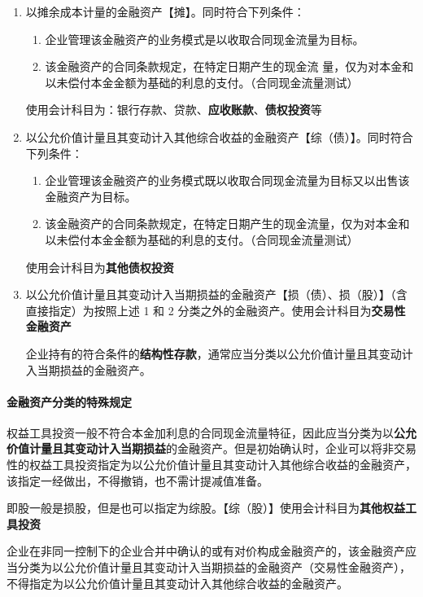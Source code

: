 \documentclass[UTF8,12pt]{ctexart}
\numberwithin{equation}{section} %
\numberwithin{figure}{section}
\numberwithin{table}{section}
\begin{document}
	\begin{enumerate}
		\item 以摊余成本计量的金融资产【摊】。同时符合下列条件：
		\begin{enumerate}
			\item 企业管理该金融资产的业务模式是以收取合同现金流量为目标。
			
			\item 该金融资产的合同条款规定，在特定日期产生的现金流 量，仅为对本金和以未偿付本金金额为基础的利息的支付。（合同现金流量测试）
		\end{enumerate}
	
		使用会计科目为：银行存款、贷款、\textbf{应收账款}、\textbf{债权投资}等
		
		\item 以公允价值计量且其变动计入其他综合收益的金融资产【综（债）】。同时符合下列条件：
		\begin{enumerate}
			\item 企业管理该金融资产的业务模式既以收取合同现金流量为目标又以出售该金融资产为目标。
			
			\item 该金融资产的合同条款规定，在特定日期产生的现金流量，仅为对本金和以未偿付本金金额为基础的利息的支付。（合同现金流量测试）
		\end{enumerate}
	
		使用会计科目为\textbf{其他债权投资}
		
		\item 以公允价值计量且其变动计入当期损益的金融资产【损（债）、损（股）】（含直接指定）为按照上述 1 和 2 分类之外的金融资产。使用会计科目为\textbf{交易性金融资产}
		
		企业持有的符合条件的\textbf{结构性存款}，通常应当分类以公允价值计量且其变动计入当期损益的金融资产。
	\end{enumerate}
	
	\paragraph{金融资产分类的特殊规定}
	权益工具投资一般不符合本金加利息的合同现金流量特征，因此应当分类为以\textbf{公允价值计量且其变动计入当期损益}的金融资产。但是初始确认时，企业可以将非交易性的权益工具投资指定为以公允价值计量且其变动计入其他综合收益的金融资产，该指定一经做出，不得撤销，也不需计提减值准备。
	
	即股一般是损股，但是也可以指定为综股。【综（股）】使用会计科目为\textbf{其他权益工具投资}
	
	企业在非同一控制下的企业合并中确认的或有对价构成金融资产的，该金融资产应当分类为以公允价值计量且其变动计入当期损益的金融资产（交易性金融资产），不得指定为以公允价值计量且其变动计入其他综合收益的金融资产。
\end{document}
